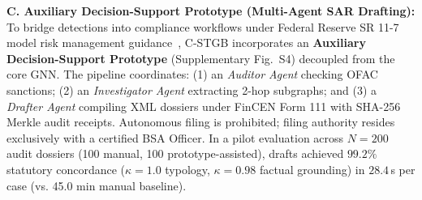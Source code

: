 \noindent\textbf{C. Auxiliary Decision-Support Prototype (Multi-Agent SAR Drafting):}
To bridge detections into compliance workflows under Federal Reserve SR 11-7 model risk management guidance~\cite{fed2011sr117}, C-STGB incorporates an \textbf{Auxiliary Decision-Support Prototype} (Supplementary Fig.~S4) decoupled from the core GNN. The pipeline coordinates: (1) an \textit{Auditor Agent} checking OFAC sanctions; (2) an \textit{Investigator Agent} extracting 2-hop subgraphs; and (3) a \textit{Drafter Agent} compiling XML dossiers under FinCEN Form 111 with SHA-256 Merkle audit receipts. Autonomous filing is prohibited; filing authority resides exclusively with a certified BSA Officer. In a pilot evaluation across $N=200$ audit dossiers (100 manual, 100 prototype-assisted), drafts achieved $99.2\%$ statutory concordance ($\kappa = 1.0$ typology, $\kappa = 0.98$ factual grounding) in $28.4$\,s per case (vs. 45.0 min manual baseline).
